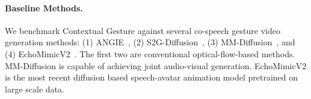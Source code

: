 \begin{table*}[t]
\centering
\caption{Quantitative results shows our method performs better in terms of gesture motions and video generation quality.}
\vspace{-0.2cm}
\label{tab:comparison}
\vspace{-0.2cm}
\end{table*}

\vspace{-0.2cm}
\paragraph{Baseline Methods.}
We benchmark Contextual Gesture against several co-speech gesture video generation methods: (1) ANGIE~\cite{angie}, (2) S2G-Diffusion~\cite{s2gdiffusion}, (3) MM-Diffusion~\cite{ruan2022mmdiffusion}, and
(4) EchoMimicV2~\cite{meng2024echomimic}. The first two are conventional optical-flow-based methods. MM-Diffusion is capable of achieving joint audio-visual generation. EchoMimicV2 is the most recent diffusion based speech-avatar animation model pretrained on large scale data.








